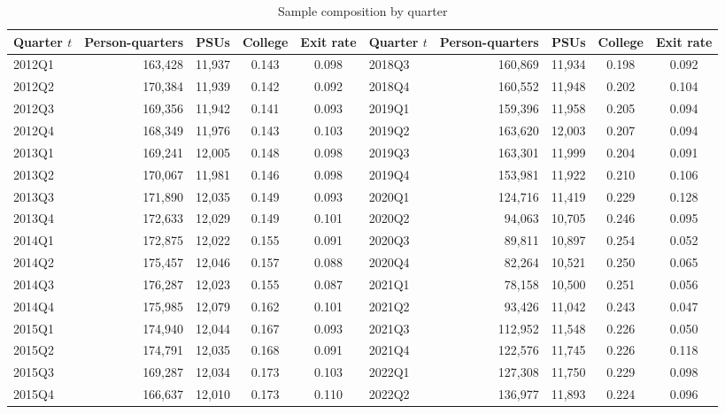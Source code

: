 \begin{table}[H]
\centering
\caption{Sample composition by quarter}
\label{tab:sample_by_quarter}
\begin{threeparttable}
\scriptsize
\setlength{\tabcolsep}{4pt}
\begin{tabular}{lrrcc@{\hspace{1.5em}}lrrcc}
\toprule
Quarter $t$ & Person-quarters & PSUs & College & Exit rate & Quarter $t$ & Person-quarters & PSUs & College & Exit rate \\
\midrule
2012Q1 & 163,428 & 11,937 & 0.143 & 0.098 & 2018Q3 & 160,869 & 11,934 & 0.198 & 0.092 \\
2012Q2 & 170,384 & 11,939 & 0.142 & 0.092 & 2018Q4 & 160,552 & 11,948 & 0.202 & 0.104 \\
2012Q3 & 169,356 & 11,942 & 0.141 & 0.093 & 2019Q1 & 159,396 & 11,958 & 0.205 & 0.094 \\
2012Q4 & 168,349 & 11,976 & 0.143 & 0.103 & 2019Q2 & 163,620 & 12,003 & 0.207 & 0.094 \\
2013Q1 & 169,241 & 12,005 & 0.148 & 0.098 & 2019Q3 & 163,301 & 11,999 & 0.204 & 0.091 \\
2013Q2 & 170,067 & 11,981 & 0.146 & 0.098 & 2019Q4 & 153,981 & 11,922 & 0.210 & 0.106 \\
2013Q3 & 171,890 & 12,035 & 0.149 & 0.093 & 2020Q1 & 124,716 & 11,419 & 0.229 & 0.128 \\
2013Q4 & 172,633 & 12,029 & 0.149 & 0.101 & 2020Q2 & 94,063 & 10,705 & 0.246 & 0.095 \\
2014Q1 & 172,875 & 12,022 & 0.155 & 0.091 & 2020Q3 & 89,811 & 10,897 & 0.254 & 0.052 \\
2014Q2 & 175,457 & 12,046 & 0.157 & 0.088 & 2020Q4 & 82,264 & 10,521 & 0.250 & 0.065 \\
2014Q3 & 176,287 & 12,023 & 0.155 & 0.087 & 2021Q1 & 78,158 & 10,500 & 0.251 & 0.056 \\
2014Q4 & 175,985 & 12,079 & 0.162 & 0.101 & 2021Q2 & 93,426 & 11,042 & 0.243 & 0.047 \\
2015Q1 & 174,940 & 12,044 & 0.167 & 0.093 & 2021Q3 & 112,952 & 11,548 & 0.226 & 0.050 \\
2015Q2 & 174,791 & 12,035 & 0.168 & 0.091 & 2021Q4 & 122,576 & 11,745 & 0.226 & 0.118 \\
2015Q3 & 169,287 & 12,034 & 0.173 & 0.103 & 2022Q1 & 127,308 & 11,750 & 0.229 & 0.098 \\
2015Q4 & 166,637 & 12,010 & 0.173 & 0.110 & 2022Q2 & 136,977 & 11,893 & 0.224 & 0.096 \\

\end{tabular}
\end{threeparttable}
\end{table}
